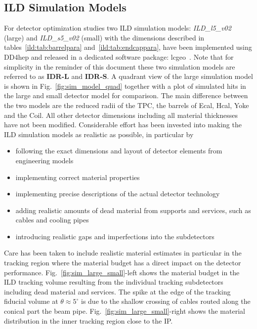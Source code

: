 \subsection{\label{sec:det-models} ILD Simulation Models}

For detector optimization studies two ILD simulation models: \emph{ ILD\_l5\_v02} (large)
and \emph{ ILD\_s5\_v02} (small) with the dimensions described in tables~\ref{ild:tab:barrelpara} and~\ref{ild:tab:endcappara},
have been implemented using DD4hep and released in a dedicated software package: lcgeo~\cite{bib:lcgeo}.
Note that for simplicity in the reminder of this document these two simulation models are referred to as \textbf{IDR-L} and \textbf{IDR-S}.
A quadrant view of the large simulation model is shown in Fig.~\ref{fig:sim_model_quad} together with a plot of simulated
hits in the large and small detector model for comparison. The main difference between the two models are the reduced radii of
the TPC, the barrels of Ecal, Hcal, Yoke and the Coil. All other detector dimensions including all material thicknesses have not been modified.
%
Considerable effort has been invested into making the ILD simulation models as realistic as possible, in particular by
\begin{itemize}
\item following the exact dimensions and layout of detector elements from engineering models
\item implementing correct material properties
\item implementing precise descriptions of the actual detector technology
\item adding realistic amounts of dead material from supports and services, such as cables and cooling pipes
\item introducing realistic gaps and imperfections into the subdetectors
\end{itemize}
Care has been taken to include realistic material estimates in particular in the tracking region where
the material budget has a direct impact on the detector performance. 
Fig.~\ref{fig:sim_large_small}-left shows the  material budget in the ILD tracking volume resulting from the
individual tracking subdetectors including dead material and services. The spike at the edge of the tracking
fiducial volume at $\theta \approx 5^{\circ}$ is due to the shallow crossing of cables routed along the
conical part the beam pipe. Fig.~\ref{fig:sim_large_small}-right shows the material distribution in the
inner tracking region close to the IP.

